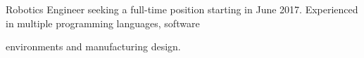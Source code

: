 \begin{cventries}
  \cventry
    {}%
    {}
    {}
    {}
    {
    \vspace{-10pt}
      \begin{cvitems}
        \item[]\hspace{14pt}Robotics Engineer seeking a full-time position starting in June 2017. Experienced in multiple programming languages, software
        \item[]\hspace{14pt}environments and manufacturing design. 
      \end{cvitems}
    }

\end{cventries}
 